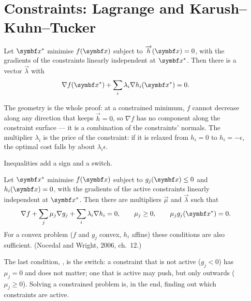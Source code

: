 \section{Constraints: Lagrange and Karush--Kuhn--Tucker}

\begin{theorem}
\label{thm:J-lagrange}
Let $\vx^*$ minimise $f(\vx)$ subject to $\vec h(\vx) = 0$, with the gradients of the constraints linearly independent at $\vx^*$. Then there is a vector $\vec\lambda$ with
\begin{equation}\label{eq:J-lagrange}
  \nabla f(\vx^*) + \sum_i\lambda_i\nabla h_i(\vx^*) = 0 .
\end{equation}
\end{theorem}

The geometry is the whole proof: at a constrained minimum, $f$ cannot decrease along any direction that keeps $\vec h = 0$, so $\nabla f$ has no component along the constraint surface — it is a combination of the constraints' normals. The multiplier $\lambda_i$ is the price of the constraint: if it is relaxed from $h_i = 0$ to $h_i = -\epsilon$, the optimal cost falls by about $\lambda_i\epsilon$.

Inequalities add a sign and a switch.

\begin{theorem}
\label{thm:J-kkt}
Let $\vx^*$ minimise $f(\vx)$ subject to $g_j(\vx) \le 0$ and $h_i(\vx) = 0$, with the gradients of the active constraints linearly independent at $\vx^*$. Then there are multipliers $\vec\mu$ and $\vec\lambda$ such that
\begin{equation}\label{eq:J-kkt}
  \nabla f + \sum_j\mu_j\nabla g_j + \sum_i\lambda_i\nabla h_i = 0, \qquad \mu_j \ge 0, \qquad \mu_jg_j(\vx^*) = 0 .
\end{equation}
For a convex problem ($f$ and $g_j$ convex, $h_i$ affine) these conditions are also sufficient. (Nocedal and Wright, 2006, ch.~12.)
\end{theorem}

The last condition, , is the switch: a constraint that is not active ($g_j < 0$) has $\mu_j = 0$ and does not matter; one that is active may push, but only outwards ($\mu_j \ge 0$). Solving a constrained problem is, in the end, finding out which constraints are active.

